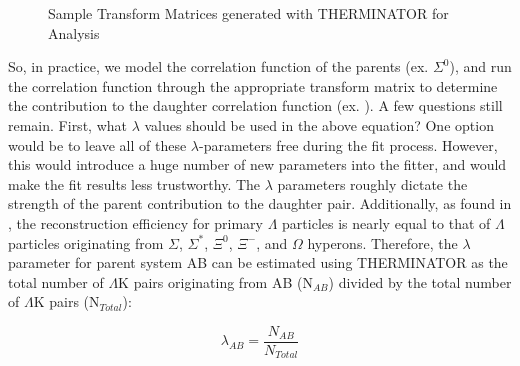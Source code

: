 \documentclass[/home/jesse/Analysis/FemtoAnalysis/AnalysisNotes/AnalysisNoteJBuxton.tex]{subfiles}
\begin{document}
\begin{figure}[h!]
  \caption[Sample Transform Matrices for \ALamKchP Analysis]{Sample Transform Matrices generated with THERMINATOR for \ALamKchP Analysis}
  \label{fig:TransformMatricesALamKchP}
\end{figure}


So, in practice, we model the correlation function of the parents (ex. $\Sigma^{0}$\KchP), and run the correlation function through the appropriate transform matrix to determine the contribution to the daughter correlation function (ex. \LamKchP).  A few questions still remain.  First, what $\lambda$ values should be used in the above equation?  One option would be to leave all of these $\lambda$-parameters free during the fit process.  However, this would introduce a huge number of new parameters into the fitter, and would make the fit results less trustworthy.  The $\lambda$ parameters roughly dictate the strength of the parent contribution to the daughter pair.  Additionally, as found in \cite{Salzwedel:2241303}, the reconstruction efficiency for primary $\Lambda$ particles is nearly equal to that of $\Lambda$ particles originating from $\Sigma$, $\Sigma^{*}$, $\Xi^{0}$, $\Xi^{-}$, and $\Omega$ hyperons.  Therefore, the $\lambda$ parameter for parent system AB can be estimated using THERMINATOR as the total number of $\Lambda$K pairs originating from AB (N$_{AB}$) divided by the total number of $\Lambda$K pairs (N$_{Total}$):

\begin{equation}
\lambda_{AB} = \frac{N_{AB}}{N_{Total}}
\end{equation}
\end{document}
